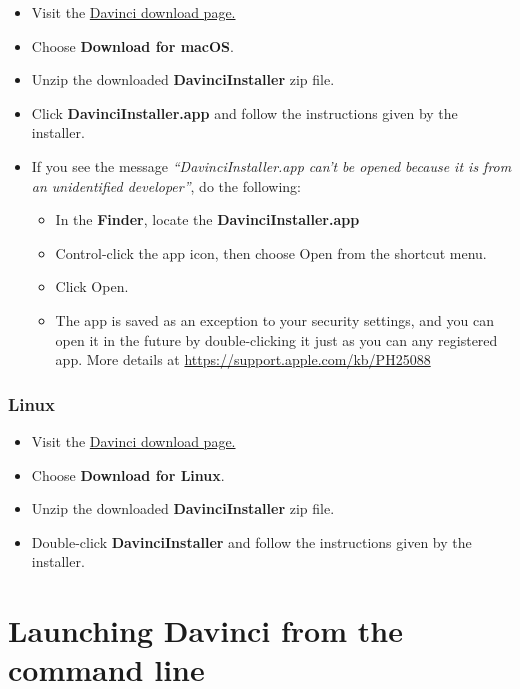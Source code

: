 \begin{itemize}
	\item Visit the \href{http://davinci.sazonov.org/}{Davinci download page.}
	\item Choose \textbf{Download for macOS}.
	\item Unzip the downloaded \textbf{DavinciInstaller} zip file.
	\item Click \textbf{DavinciInstaller.app} and follow the instructions given by the installer.
	\item If you see the message \textit{``DavinciInstaller.app can't be opened because it is from an unidentified developer''}, do the following:
	\begin{itemize}
		\item In the \textbf{Finder}, locate the \textbf{DavinciInstaller.app}
		\item Control-click the app icon, then choose Open from the shortcut menu.
		\item Click Open.
		\item The app is saved as an exception to your security settings, and you can open it in the future by double-clicking it just as you can any registered app. More details at \url{https://support.apple.com/kb/PH25088}
  \end{itemize}
\end{itemize}

\subsubsection{Linux}

\begin{itemize}
	\item Visit the \href{http://davinci.sazonov.org/}{Davinci download page.}
	\item Choose \textbf{Download for Linux}.
	\item Unzip the downloaded \textbf{DavinciInstaller} zip file.
	\item Double-click \textbf{DavinciInstaller} and follow the instructions given by the installer.
\end{itemize}

\section{Launching Davinci from the command line}

